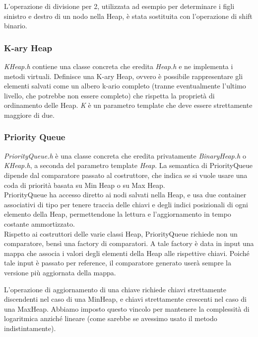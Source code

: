 \noindent L'operazione di divisione per 2, utilizzata ad esempio per determinare i figli sinistro e destro di un nodo nella Heap, è stata sostituita con l'operazione di shift binario.

\subsubsection{K-ary Heap}

\textit{KHeap.h} contiene una classe concreta che eredita \textit{Heap.h} e ne implementa i metodi virtuali. Definisce una K-ary Heap, ovvero è possibile rappresentare gli elementi salvati come un albero k-ario completo (tranne eventualmente l'ultimo livello, che potrebbe non essere completo) che rispetta la proprietà di ordinamento delle Heap.
\textit{K} è un parametro template che deve essere strettamente maggiore di due.

\subsubsection{Priority Queue}

\textit{PriorityQueue.h} è una classe concreta che eredita privatamente \textit{BinaryHeap.h} o \textit{KHeap.h}, a seconda del parametro template \textit{Heap}.
La semantica di PriorityQueue dipende dal comparatore passato al costruttore, che indica se si vuole usare una coda di priorità basata su Min Heap o su Max Heap. \\

\noindent PriorityQueue ha accesso diretto ai nodi salvati nella Heap, e usa due container associativi di tipo  per tenere traccia delle chiavi e degli indici posizionali di ogni elemento della Heap, permettendone la lettura e l'aggiornamento in tempo costante ammortizzato. \\

\noindent Rispetto ai costruttori delle varie classi Heap, PriorityQueue richiede non un comparatore, bensì una factory di comparatori. A tale factory è data in input una mappa che associa i valori degli elementi della Heap alle rispettive chiavi. Poiché tale input è passato per reference, il comparatore generato userà sempre la versione più aggiornata della mappa.

\noindent L'operazione di aggiornamento di una chiave richiede chiavi strettamente discendenti nel caso di una MinHeap, e chiavi strettamente crescenti nel caso di una MaxHeap. Abbiamo imposto questo vincolo per mantenere la complessità di  logaritmica anziché lineare (come sarebbe se avessimo usato il metodo  indistintamente).

